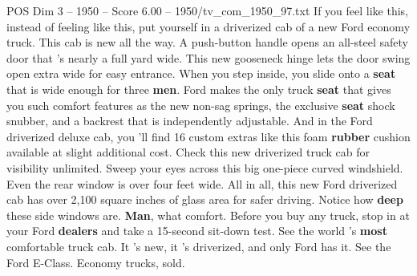 \begin{textsample}{POS Dim 3 – 1950 – Score 6.00 – 1950/tv\_com\_1950\_97.txt}  \label{ex:f3_pos_004}
If you feel like this, instead of feeling like this, put yourself in a driverized cab of a new Ford economy truck.
This cab is new all the way.
A push-button handle opens an all-steel safety door that 's nearly a full yard wide.
This new gooseneck hinge lets the door swing open extra wide for easy entrance.
When you step inside, you slide onto a \textbf{seat} that is wide enough for three \textbf{men}.
Ford makes the only truck \textbf{seat} that gives you such comfort features as the new non-sag springs, the exclusive \textbf{seat} shock snubber, and a backrest that is independently adjustable.
And in the Ford driverized deluxe cab, you 'll find 16 custom extras like this foam \textbf{rubber} cushion available at slight additional cost.
Check this new driverized truck cab for visibility unlimited.
Sweep your eyes across this big one-piece curved windshield.
Even the rear window is over four feet wide.
All in all, this new Ford driverized cab has over 2,100 square inches of glass area for safer driving.
Notice how \textbf{deep} these side windows are. \textbf{Man}, what comfort.
Before you buy any truck, stop in at your Ford \textbf{dealers} and take a 15-second sit-down test.
See the world 's \textbf{most} comfortable truck cab.
It 's new, it 's driverized, and only Ford has it.
See the Ford E-Class.
Economy trucks, sold.

\end{textsample}
